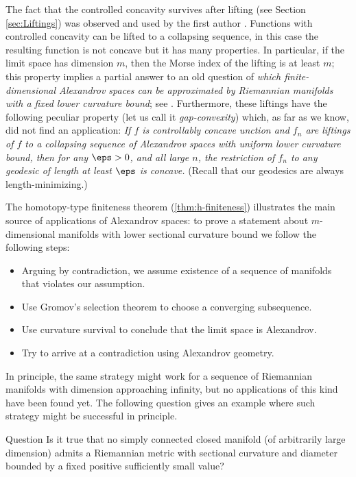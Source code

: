 The fact that the controlled concavity survives after lifting (see Section \ref{sec:Liftings}) was observed and used by the first author \cite[4.2]{kapovitch2002}.
Functions with controlled concavity can be lifted to a collapsing sequence, in this case the resulting function is not concave but it has many properties.
In particular, if the limit space has dimension $m$, then the Morse index of the lifting is at least $m$;
this property implies a partial answer to an old question of \textit{which finite-dimensional Alexandrov spaces can be approximated by Riemannian manifolds with a fixed lower curvature bound}; see \cite{kapovitch2005}.
Furthermore, these liftings have the following peculiar property (let us call it \emph{gap-convexity}) which, as far as we know, did not find an application:
\textit{If $f$ is controllably concave unction and $f_n$ are liftings of $f$ to a collapsing sequence of Alexandrov spaces with uniform lower curvature bound, then for any $\eps>0$, and all large $n$, the restriction of $f_n$ to any geodesic of length at least $\eps$ is concave.}
(Recall that our geodesics are always length-minimizing.)

The homotopy-type finiteness theorem (\ref{thm:h-finiteness}) illustrates the main source of applications of Alexandrov spaces: to prove a statement about $m$-dimensional manifolds with lower sectional curvature bound we follow the following steps:
\begin{itemize}
\item Arguing by contradiction, we assume existence of a sequence of manifolds that violates our assumption.
\item Use Gromov's selection theorem to choose a converging subsequence.
\item Use curvature survival to conclude that the limit space is Alexandrov.
\item Try to arrive at a contradiction using Alexandrov geometry.
\end{itemize}

In principle, the same strategy might work for a sequence of Riemannian manifolds with dimension approaching infinity, but no applications of this kind have been  found yet.
The following question gives an example where such strategy might be successful in principle.

\begin{thm}{Question}
Is it true that no simply connected closed manifold (of arbitrarily large dimension) admits a Riemannian metric with sectional curvature and diameter bounded by a fixed positive sufficiently small value?
\end{thm}

